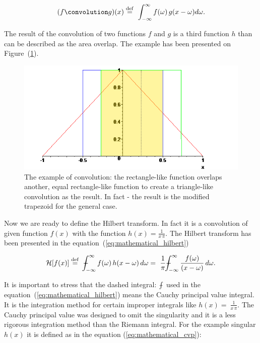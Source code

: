 \documentclass[12pt,twoside,a4paper]{article}
\numberwithin{equation}{subsection}
\numberwithin{figure}{subsection}
\def\Xint#1{\mathchoice
{\XXint\displaystyle\textstyle{#1}}%
{\XXint\textstyle\scriptstyle{#1}}%
{\XXint\scriptstyle\scriptscriptstyle{#1}}%
{\XXint\scriptscriptstyle\scriptscriptstyle{#1}}%
\!\int}
\def\XXint#1#2#3{{\setbox0=\hbox{$#1{#2#3}{\int}$ }\vcenter{\hbox{$#2#3$ }}\kern-.6\wd0}}
\def\dashint{\Xint-}
\begin{document}
\begin{equation} \label{eh:mth_convolution}
	(f \convolution g)(x) \stackrel{\mathrm{def}}{=}\  \int_{-\infty }^{\infty } f(\omega) \, g(x - \omega) d\omega .
\end{equation}
 
The result of the convolution of two functions $f$ and $g$ is a third function $h$ than can be described as the area overlap. The example
has been presented on Figure~(\ref{fig:mathematical_convolution}).

\begin{figure} 
	\begin{center}
		\includegraphics{img/convolution.png}
		\caption{The example of convolution: the rectangle-like function overlaps another, equal rectangle-like function to create a
		triangle-like convolution as the result. In fact - the result is the modified trapezoid for the general case.
		\label{fig:mathematical_convolution}}
	\end{center}
\end{figure}  

Now we are ready to define the Hilbert transform. In fact it is a convolution of given function $f(x)$ with the function $h(x) =
\frac{1}{x \, \pi}$. The Hilbert transform has been presented in the equation~(\ref{eq:mathematical_hilbert})

\begin{equation} \label{eq:mathematical_hilbert}
	\mathcal{H}[f(x)] \stackrel{\mathrm{def}}{=}
	 \ \dashint_{ - \infty }^{\infty } f(\omega) \, h(x - \omega) \, d\omega 
	=\ \frac{1}{\pi} \dashint_{ - \infty }^{\infty } \frac{f(\omega)}{(x - \omega)} \, d\omega . 
\end{equation}

It is important to stress that the dashed integral: $\dashint$ used in the equation~(\ref{eq:mathematical_hilbert}) means the Cauchy
principal value integral. It is the integration method for certain improper integrals like $h(x) =\ \frac{1}{x \, \pi}$. The Cauchy
principal value was designed to omit the singularity and it is a less rigorous integration method than the Riemann integral. For the example
singular $ h(x) $ it is defined as in the equation (\ref{eq:mathematical_cvp}):
\end{document}
